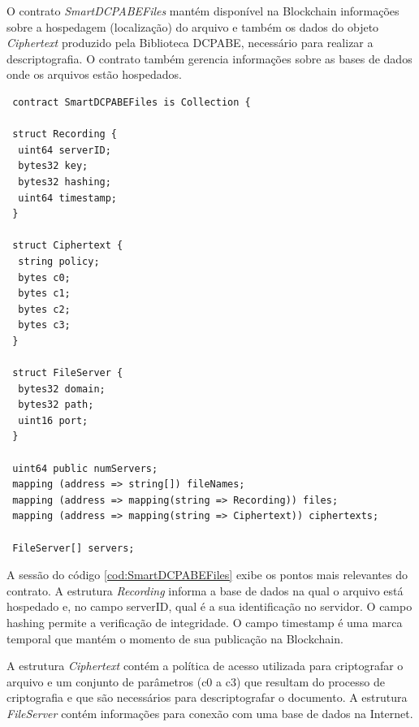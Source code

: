 \documentclass[a4paper,11pt]{article}
\begin{document}

O contrato \emph{SmartDCPABEFiles} mantém disponível na Blockchain informações sobre a hospedagem (localização) do arquivo e também os dados do objeto \emph{Ciphertext} produzido pela Biblioteca DCPABE, necessário para realizar a descriptografia.
O contrato também gerencia informações sobre as bases de dados onde os arquivos estão hospedados.


\begin{lstlisting}
 contract SmartDCPABEFiles is Collection {

 struct Recording {
  uint64 serverID;
  bytes32 key;
  bytes32 hashing;
  uint64 timestamp;
 }

 struct Ciphertext {
  string policy;
  bytes c0;
  bytes c1;
  bytes c2;
  bytes c3;
 }

 struct FileServer {
  bytes32 domain;
  bytes32 path;
  uint16 port;
 }

 uint64 public numServers;
 mapping (address => string[]) fileNames;
 mapping (address => mapping(string => Recording)) files;
 mapping (address => mapping(string => Ciphertext)) ciphertexts;

 FileServer[] servers;
\end{lstlisting}


A sessão do código \ref{cod:SmartDCPABEFiles} exibe os pontos mais relevantes do contrato.
A estrutura \emph{Recording} informa a base de dados na qual o arquivo está hospedado e, no campo serverID, qual é a sua identificação no servidor.
O campo hashing permite a verificação de integridade.
O campo timestamp é uma marca temporal que mantém o momento de sua publicação na Blockchain. %

A estrutura \emph{Ciphertext} contém a política de acesso utilizada para criptografar o arquivo e um conjunto de parâmetros (c0 a c3) que resultam do processo de criptografia e que são necessários para descriptografar o documento.
A estrutura \emph{FileServer} contém informações para conexão com uma base de dados na Internet.
\end{document}
